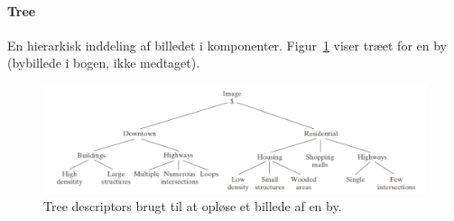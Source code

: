 \paragraph{Tree}

En hierarkisk inddeling af billedet i komponenter. Figur~\ref{fig:tree-town-image} viser træet for en by (bybillede i bogen, ikke medtaget). 

\begin{figure}[H]
	\centering
	\includegraphics[width=\linewidth]{figs/spm12/tree-town-image}
	\caption{Tree descriptors brugt til at opløse et billede af en by.}
	\label{fig:tree-town-image}
\end{figure}



